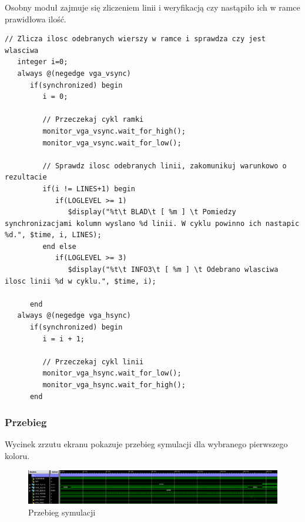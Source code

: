 \documentclass[a4paper,12pt]{article}
\begin{document}
Osobny moduł zajmuje się zliczeniem linii i weryfikacją czy nastąpiło ich w ramce prawidłowa ilość.
\begin{lstlisting}[label=Vga_Behav_Lines_Counter,caption=Vga\_Behav\_Lines\_Counter.v,firstnumber=40]
   // Zlicza ilosc odebranych wierszy w ramce i sprawdza czy jest wlasciwa
   integer i=0;
   always @(negedge vga_vsync)
      if(synchronized) begin
         i = 0;

         // Przeczekaj cykl ramki
         monitor_vga_vsync.wait_for_high();
         monitor_vga_vsync.wait_for_low();

         // Sprawdz ilosc odebranych linii, zakomunikuj warunkowo o rezultacie
         if(i != LINES+1) begin
            if(LOGLEVEL >= 1)
               $display("%t\t BLAD\t [ %m ] \t Pomiedzy synchronizacjami kolumn wyslano %d linii. W cyklu powinno ich nastapic %d.", $time, i, LINES);
         end else
            if(LOGLEVEL >= 3)
               $display("%t\t INFO3\t [ %m ] \t Odebrano wlasciwa ilosc linii %d w cyklu.", $time, i);

      end
   always @(negedge vga_hsync)
      if(synchronized) begin
         i = i + 1;

         // Przeczekaj cykl linii
         monitor_vga_hsync.wait_for_low();
         monitor_vga_hsync.wait_for_high();
      end
\end{lstlisting}


\subsubsection{Przebieg}

Wycinek zrzutu ekranu pokazuje przebieg symulacji dla wybranego pierwszego koloru.
\begin{figure}[htb]
   \centering
   \includegraphics[width=15cm]{grafika/vga_sim.png}
   \caption{Przebieg symulacji}
\end{figure}
\end{document}
